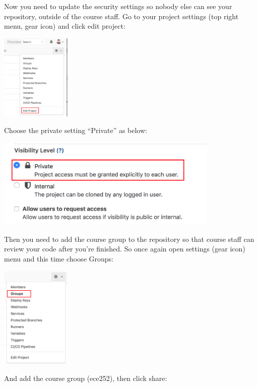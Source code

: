 Now you need to update the security settings so nobody else can see your repository, outside of the course staff. Go to your project settings (top right menu, gear icon) and click edit project:

\begin{center}
	\includegraphics[width=0.25\textwidth]{images/gitlab-settings.png}
\end{center}

Choose the private setting ``Private'' as below:

\begin{center}
	\includegraphics[width=0.8\textwidth]{images/gitlab-private.png}
\end{center}

Then you need to add the course group to the repository so that course staff can review your code after you're finished. So once again open settings (gear icon) menu and this time choose Groups:

\begin{center}
	\includegraphics[width=0.25\textwidth]{images/gitlab-groups.png}
\end{center}

And add the course group (ece252), then click share:

